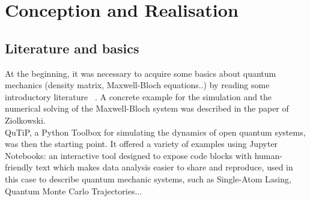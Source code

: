 \chapter{Conception and Realisation}
\label{chapter:conception}

\section{Literature and basics}
At the beginning, it was necessary to acquire some basics about quantum mechanics (density matrix, Maxwell-Bloch equations..) by reading some introductory literature ~\cite{bastard1992}. A concrete example for the simulation and the numerical solving of the Maxwell-Bloch system was described in the paper of Ziolkowski.\\
QuTiP, a Python Toolbox for simulating the dynamics of open quantum systems, was then the starting point. It offered a variety of examples using Jupyter Notebooks: an interactive tool designed to expose code blocks with human-friendly text which makes data analysis easier to share and reproduce, used in this case to describe quantum mechanic systems, such as Single-Atom Lasing, Quantum Monte Carlo Trajectories...\\

